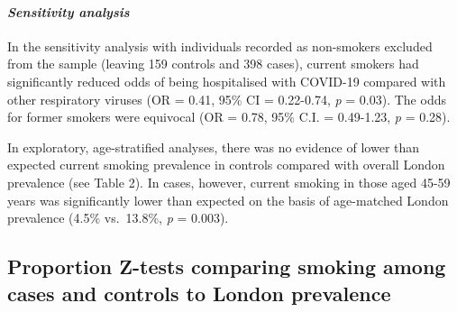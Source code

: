 \documentclass[
]{article}
\begin{document}
\hypertarget{sensitivity-analysis}{%
\paragraph{\texorpdfstring{\emph{Sensitivity
analysis}}{Sensitivity analysis}}\label{sensitivity-analysis}}

In the sensitivity analysis with individuals recorded as non-smokers
excluded from the sample (leaving 159 controls and 398 cases), current
smokers had significantly reduced odds of being hospitalised with
COVID-19 compared with other respiratory viruses (OR = 0.41, 95\% CI =
0.22-0.74, \emph{p} = 0.03). The odds for former smokers were equivocal
(OR = 0.78, 95\% C.I. = 0.49-1.23, \emph{p} = 0.28).

In exploratory, age-stratified analyses, there was no evidence of lower
than expected current smoking prevalence in controls compared with
overall London prevalence (see Table 2). In cases, however, current
smoking in those aged 45-59 years was significantly lower than expected
on the basis of age-matched London prevalence (4.5\% vs.~13.8\%,
\emph{p} = 0.003).

\hypertarget{proportion-z-tests-comparing-smoking-among-cases-and-controls-to-london-prevalence}{%
\subsection{Proportion Z-tests comparing smoking among cases and
controls to London
prevalence}\label{proportion-z-tests-comparing-smoking-among-cases-and-controls-to-london-prevalence}}
\end{document}

